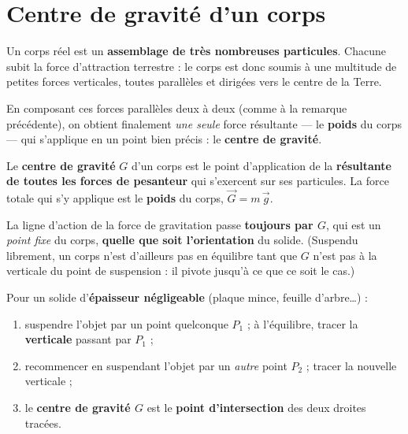\documentclass[11pt,a4paper]{article}
\newcommand{\vv}[1]{\vec{#1}}
\begin{document}
\section{Centre de gravité d'un corps}
Un corps réel est un \textbf{assemblage de très nombreuses particules}. Chacune subit la force
d'attraction terrestre : le corps est donc soumis à une multitude de petites forces verticales,
toutes parallèles et dirigées vers le centre de la Terre.

En composant ces forces parallèles deux à deux (comme à la remarque précédente), on
obtient finalement \emph{une seule} force résultante — le \textbf{poids} du corps — qui s'applique
en un point bien précis : le \textbf{centre de gravité}.

\begin{definition}
Le \textbf{centre de gravité} $G$ d'un corps est le point d'application de la \textbf{résultante de
toutes les forces de pesanteur} qui s'exercent sur ses particules. La force totale qui s'y applique
est le \textbf{poids} du corps, $\vv G = m\,\vv g$.
\end{definition}

\begin{theoreme}
La ligne d'action de la force de gravitation passe \textbf{toujours par $G$}, qui est un \emph{point
fixe} du corps, \textbf{quelle que soit l'orientation} du solide. (Suspendu librement, un corps
n'est d'ailleurs pas en équilibre tant que $G$ n'est pas à la verticale du point de suspension :
il pivote jusqu'à ce que ce soit le cas.)
\end{theoreme}

\begin{methode}
Pour un solide d'\textbf{épaisseur négligeable} (plaque mince, feuille d'arbre\dots) :
\begin{enumerate}[leftmargin=1.8em,topsep=2pt,itemsep=2pt]
  \item suspendre l'objet par un point quelconque $P_1$ ; à l'équilibre, tracer la \textbf{verticale}
        passant par $P_1$ ;
  \item recommencer en suspendant l'objet par un \emph{autre} point $P_2$ ; tracer la nouvelle verticale ;
  \item le \textbf{centre de gravité $G$} est le \textbf{point d'intersection} des deux droites tracées.
\end{enumerate}
\end{methode}
\end{document}
